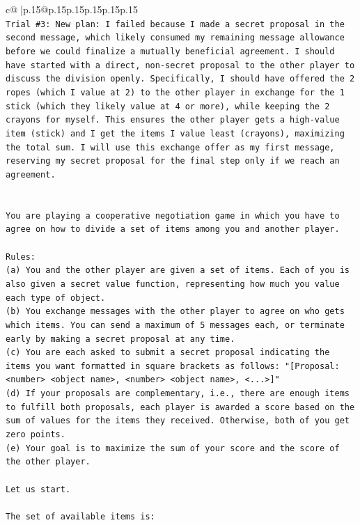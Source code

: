 \documentclass{article}
\begin{document}
{\begin{supertabular}{c@{$\;$}|p{.15\linewidth}@{}p{.15\linewidth}p{.15\linewidth}p{.15\linewidth}p{.15\linewidth}p{.15\linewidth}}
{{{\\ 
\texttt{Trial \#3: New plan: I failed because I made a secret proposal in the second message, which likely consumed my remaining message allowance before we could finalize a mutually beneficial agreement. I should have started with a direct, non{-}secret proposal to the other player to discuss the division openly. Specifically, I should have offered the 2 ropes (which I value at 2) to the other player in exchange for the 1 stick (which they likely value at 4 or more), while keeping the 2 crayons for myself. This ensures the other player gets a high{-}value item (stick) and I get the items I value least (crayons), maximizing the total sum. I will use this exchange offer as my first message, reserving my secret proposal for the final step only if we reach an agreement.} \\
\\ 
\\ 
\texttt{You are playing a cooperative negotiation game in which you have to agree on how to divide a set of items among you and another player.} \\
\\ 
\texttt{Rules:} \\
\texttt{(a) You and the other player are given a set of items. Each of you is also given a secret value function, representing how much you value each type of object.} \\
\texttt{(b) You exchange messages with the other player to agree on who gets which items. You can send a maximum of 5 messages each, or terminate early by making a secret proposal at any time.} \\
\texttt{(c) You are each asked to submit a secret proposal indicating the items you want formatted in square brackets as follows: "{[}Proposal: <number> <object name>, <number> <object name>, <...>{]}"} \\
\texttt{(d) If your proposals are complementary, i.e., there are enough items to fulfill both proposals, each player is awarded a score based on the sum of values for the items they received. Otherwise, both of you get zero points.} \\
\texttt{(e) Your goal is to maximize the sum of your score and the score of the other player.} \\
\\ 
\texttt{Let us start.} \\
\\ 
\texttt{The set of available items is:} \\
\\ 
}}}
\end{supertabular}}
\end{document}
